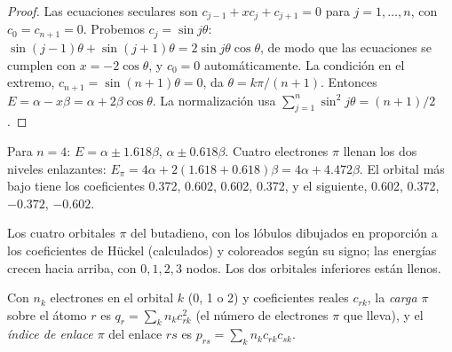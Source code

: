 \begin{proof}
Las ecuaciones seculares son $c_{j-1} + xc_j + c_{j+1} = 0$ para $j = 1, \dots, n$, con
$c_0 = c_{n+1} = 0$. Probemos $c_j = \sin j\theta$: $\sin(j - 1)\theta + \sin(j + 1)\theta = 2\sin
j\theta\cos\theta$, de modo que las ecuaciones se cumplen con $x = -2\cos\theta$, y $c_0 = 0$
automáticamente. La condición en el extremo, $c_{n+1} = \sin(n + 1)\theta = 0$, da $\theta =
k\pi/(n + 1)$. Entonces $E = \alpha - x\beta = \alpha + 2\beta\cos\theta$. La normalización usa
$\sum_{j=1}^n\sin^2 j\theta = (n + 1)/2$.
\end{proof}

\begin{example}[El butadieno]\label{ex:b2:huckel:butadiene}
Para $n = 4$: $E = \alpha \pm 1.618\beta$, $\alpha \pm 0.618\beta$. Cuatro electrones $\pi$ llenan los dos
niveles enlazantes: $E_\pi = 4\alpha + 2(1.618 + 0.618)\beta = 4\alpha + 4.472\beta$. El orbital
más bajo tiene los coeficientes 0.372, 0.602, 0.602, 0.372, y el siguiente, 0.602, 0.372,
$-0.372$, $-0.602$.
\end{example}

\begin{omfigure}

{\small Los cuatro orbitales $\pi$ del butadieno, con los lóbulos dibujados en proporción a los
coeficientes de Hückel (calculados) y coloreados según su signo; las energías crecen
hacia arriba, con $0, 1, 2, 3$ nodos. Los dos orbitales inferiores están llenos.}
\end{omfigure}

\begin{definition}\label{def:b2:huckel:indices}
Con $n_k$ electrones en el orbital $k$ (0, 1 o 2) y coeficientes reales $c_{rk}$, la
\emph{carga $\pi$} sobre el átomo $r$ es $q_r = \sum_k n_kc_{rk}^2$ (el
número de electrones $\pi$ que lleva), y el \emph{índice de enlace $\pi$}
del enlace $rs$ es $p_{rs} = \sum_k n_kc_{rk}c_{sk}$.
\end{definition}


